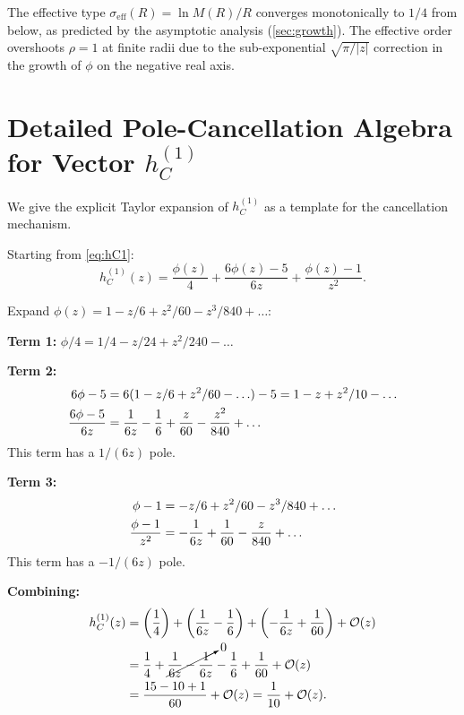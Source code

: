 \documentclass[11pt,a4paper]{article}
\theoremstyle{plain}
\theoremstyle{definition}
\begin{document}
The effective type $\sigma_{\mathrm{eff}}(R) = \ln M(R)/R$ converges
monotonically to $1/4$ from below, as predicted by the asymptotic analysis
(\cref{sec:growth}). The effective order overshoots $\rho = 1$ at finite
radii due to the sub-exponential $\sqrt{\pi/|z|}$ correction in the
growth of $\phi$ on the negative real axis.

\section{Detailed Pole-Cancellation Algebra for Vector $h_C^{(1)}$}
\label{app:vector}

We give the explicit Taylor expansion of $h_C^{(1)}$ as a template
for the cancellation mechanism.

Starting from \cref{eq:hC1}:
\begin{equation}
  h_C^{(1)}(z) = \frac{\phi(z)}{4}
  + \frac{6\phi(z) - 5}{6z} + \frac{\phi(z) - 1}{z^2}.
\end{equation}

Expand $\phi(z) = 1 - z/6 + z^2/60 - z^3/840 + \ldots$:

\medskip
\noindent\textbf{Term 1:} $\phi/4 = 1/4 - z/24 + z^2/240 - \ldots$

\medskip
\noindent\textbf{Term 2:}
\begin{align}
  6\phi - 5 &= 6(1 - z/6 + z^2/60 - \ldots) - 5
  = 1 - z + z^2/10 - \ldots\notag\\
  \frac{6\phi - 5}{6z} &= \frac{1}{6z} - \frac{1}{6} + \frac{z}{60}
  - \frac{z^2}{840} + \ldots
\end{align}
This term has a $1/(6z)$ pole.

\medskip
\noindent\textbf{Term 3:}
\begin{align}
  \phi - 1 &= -z/6 + z^2/60 - z^3/840 + \ldots\notag\\
  \frac{\phi - 1}{z^2} &= -\frac{1}{6z} + \frac{1}{60}
  - \frac{z}{840} + \ldots
\end{align}
This term has a $-1/(6z)$ pole.

\medskip
\noindent\textbf{Combining:}
\begin{align}
  h_C^{(1)}(z) &= \left(\frac{1}{4}\right)
  + \left(\frac{1}{6z} - \frac{1}{6}\right)
  + \left(-\frac{1}{6z} + \frac{1}{60}\right)
  + \mathcal{O}(z)\notag\\
  &= \frac{1}{4} + \cancelto{0}{\frac{1}{6z} - \frac{1}{6z}}
  - \frac{1}{6} + \frac{1}{60} + \mathcal{O}(z)\notag\\
  &= \frac{15 - 10 + 1}{60} + \mathcal{O}(z)
  = \frac{1}{10} + \mathcal{O}(z).
\end{align}
\end{document}
